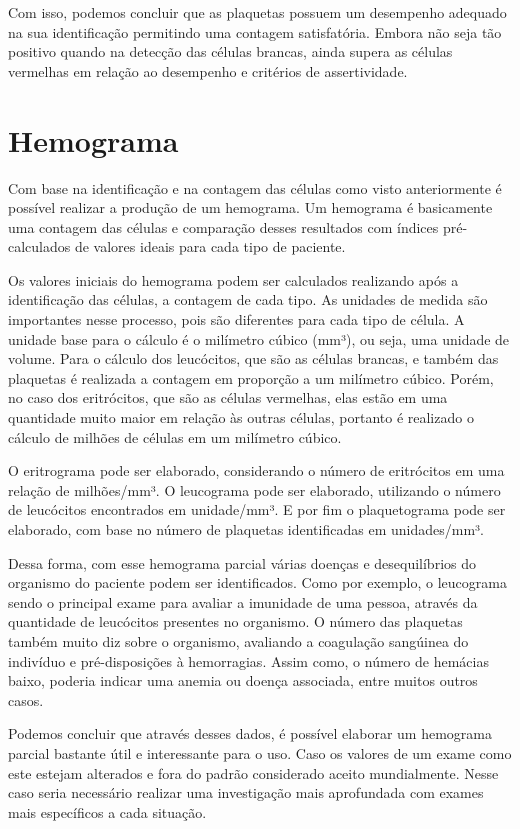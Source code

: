 Com isso, podemos concluir que as plaquetas possuem um desempenho adequado na sua identificação permitindo uma contagem satisfatória. Embora não seja tão positivo quando na detecção das células brancas, ainda supera as células vermelhas em relação ao desempenho e critérios de assertividade.

\section{Hemograma}
Com base na identificação e na contagem das células como visto anteriormente é possível realizar a produção de um hemograma. Um hemograma é basicamente uma contagem das células e comparação desses resultados com índices pré-calculados de valores ideais para cada tipo de paciente.

Os valores iniciais do hemograma podem ser calculados realizando após a identificação das células, a contagem de cada tipo. As unidades de medida são importantes nesse processo, pois são diferentes para cada tipo de célula. A unidade base para o cálculo é o milímetro cúbico (mm³), ou seja, uma unidade de volume. Para o cálculo dos leucócitos, que são as células brancas, e também das plaquetas é realizada a contagem em proporção a um milímetro cúbico. Porém, no caso dos eritrócitos, que são as células vermelhas, elas estão em uma quantidade muito maior em relação às outras células, portanto é realizado o cálculo de milhões de células em um milímetro cúbico.

O eritrograma pode ser elaborado, considerando o número de eritrócitos em uma relação de milhões/mm³. O leucograma pode ser elaborado, utilizando o número de leucócitos encontrados em unidade/mm³. E por fim o plaquetograma pode ser elaborado, com base no número de plaquetas identificadas em unidades/mm³.

Dessa forma, com esse hemograma parcial várias doenças e desequilíbrios do organismo do paciente podem ser identificados. Como por exemplo, o leucograma sendo o principal exame para avaliar a imunidade de uma pessoa, através da quantidade de leucócitos presentes no organismo. O número das plaquetas também muito diz sobre o organismo, avaliando a coagulação sangúinea do indivíduo e pré-disposições à hemorragias. Assim como, o número de hemácias baixo, poderia indicar uma anemia ou doença associada, entre muitos outros casos.

Podemos concluir que através desses dados, é possível elaborar um hemograma parcial bastante útil e interessante para o uso. Caso os valores de um exame como este estejam alterados e fora do padrão considerado aceito mundialmente. Nesse caso seria necessário realizar uma investigação mais aprofundada com exames mais específicos a cada situação.


